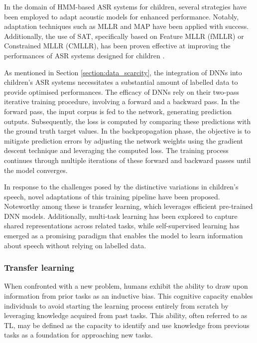 In the domain of \ac{HMM}-based \ac{ASR} systems for children, several strategies have been employed to adapt acoustic models for enhanced performance. Notably, adaptation techniques such as \ac{MLLR} and \ac{MAP} have been applied with success. Additionally, the use of \ac{SAT}, specifically based on Feature \ac{MLLR} (fMLLR) or Constrained \ac{MLLR} (CMLLR), has been proven effective at improving the performances of \ac{ASR} systems designed for children \cite{pronunciation, asr-improved2, children_language_model2, reviewASRchildren}.

As mentioned in Section \ref{section:data_scarcity}, the integration of \acp{DNN} into children's \ac{ASR} systems necessitates a substantial amount of labelled data to provide optimised performances. The efficacy of \acp{DNN} rely on their two-pass iterative training procedure, involving a forward and a backward pass. In the forward pass, the input corpus is fed to the network, generating prediction outputs. Subsequently, the loss is computed by comparing these predictions with the ground truth target values. In the backpropagation phase, the objective is to mitigate prediction errors by adjusting the network weights using the gradient descent technique and leveraging the computed loss. The training process continues through multiple iterations of these forward and backward passes until the model converges.

In response to the challenges posed by the distinctive variations in children's speech, novel adaptations of this training pipeline have been proposed. Noteworthy among these is transfer learning, which leverages efficient pre-trained \ac{DNN} models. Additionally, multi-task learning has been explored to capture shared representations across related tasks, while self-supervised learning has emerged as a promising paradigm that enables the model to learn information about speech without relying on labelled data.


\subsubsection{Transfer learning}%
\label{section:TL}

When confronted with a new problem, humans exhibit the ability to draw upon information from prior tasks as an inductive bias. This cognitive capacity enables individuals to avoid starting the learning process entirely from scratch by leveraging knowledge acquired from past tasks. This ability, often referred to as \ac{TL}, may be defined as the capacity to identify and use knowledge from previous tasks as a foundation for approaching new tasks.

